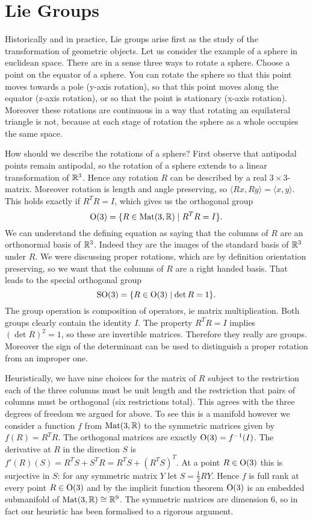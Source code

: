\section{Lie Groups}

Historically and in practice, Lie groups arise first as the study of the transformation of geometric objects.
Let us consider the example of a sphere in euclidean space.
There are in a sense three ways to rotate a sphere.
Choose a point on the equator of a sphere.
You can rotate the sphere so that this point moves towards a pole (y-axis rotation), so that this point moves along the equator (z-axis rotation), or so that the point is stationary (x-axis rotation).
Moreover these rotations are continuous in a way that rotating an equilateral triangle is not, because at each stage of rotation the sphere as a whole occupies the same space.

How should we describe the rotations of a sphere?
First observe that antipodal points remain antipodal, so the rotation of a sphere extends to a linear transformation of $\mathbb{R}^3$.
Hence any rotation $R$ can be described by a real $3\times 3$-matrix.
Moreover rotation is length and angle preserving, so $\langle Rx, Ry \rangle = \langle x, y \rangle$.
This holds exactly if $R^TR = I$, which gives us the orthogonal group
\[
\mathrm{O}(3) = \{ R \in \operatorname{Mat}(3,\mathbb{R}) \mid R^TR = I \}.
\]
We can understand the defining equation as saying that the columns of $R$ are an orthonormal basis of $\mathbb{R}^3$.
Indeed they are the images of the standard basis of $\mathbb{R}^3$ under $R$.
We were discussing proper rotations, which are by definition orientation preserving, so we want that the columns of $R$ are a right handed basis.
That leads to the special orthogonal group
\[
\mathrm{SO}(3) = \{ R \in \mathrm{O}(3) \mid \det R = 1 \}.
\]
The group operation is composition of operators, ie matrix multiplication.
Both groups clearly contain the identity $I$.
The property $R^T R = I$ implies $(\det R)^2 = 1$, so these are invertible matrices.
Therefore they really are groups.
Moreover the sign of the determinant can be used to distinguish a proper rotation from an improper one.

Heuristically, we have nine choices for the matrix of $R$ subject to the restriction each of the three columns must be unit length and the restriction that pairs of columns must be orthogonal (six restrictions total).
This agrees with the three degrees of freedom we argued for above.
To see this is a manifold however we consider a function $f$ from $\operatorname{Mat}(3,\mathbb{R})$ to the symmetric matrices given by $f(R) = R^TR$.
The orthogonal matrices are exactly $\mathrm{O}(3) = f^{-1}(I)$.
The derivative at $R$ in the direction $S$ is $f'(R)(S) = R^TS + S^T R = R^T S + (R^T S)^T$.
At a point $R \in \mathrm{O}(3)$ this is surjective in $S$: for any symmetric matrix $Y$ let $S = \frac{1}{2}RY$.
Hence $f$ is full rank at every point $R \in \mathrm{O}(3)$ and by the implicit function theorem $\mathrm{O}(3)$ is an embedded submanifold of $\operatorname{Mat}(3,\mathbb{R}) \cong \mathbb{R}^9$.
The symmetric matrices are dimension $6$, so in fact our heuristic has been formalised to a rigorous argument.

